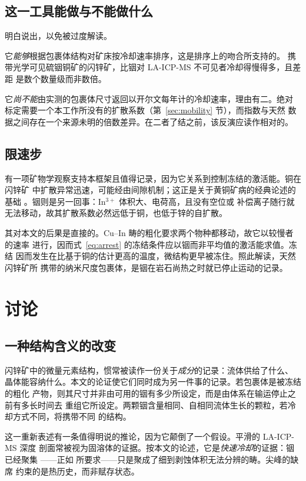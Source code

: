 \documentclass[11pt,a4paper]{ctexart}
\begin{document}
\subsection{这一工具能做与不能做什么}

明白说出，以免被过度解读。

它\emph{能够}根据包裹体结构对矿床按冷却速率排序，这是排序上的吻合所支持的。
携带光学可见硫铟铜矿的闪锌矿，比铟对 LA-ICP-MS 不可见者冷却得慢得多，且差距
是数个数量级而非数倍。

它\emph{尚不能}由实测的包裹体尺寸返回以开尔文每年计的冷却速率，理由有二。绝对
标定需要一个本工作所没有的扩散系数（第~\ref{sec:mobility} 节），而指数与天然
数据之间存在一个来源未明的倍数差异。在二者了结之前，该反演应读作相对的。

\subsection{限速步}

有一项矿物学观察支持本框架且值得记录，因为它关系到控制冻结的激活能。铜在闪锌矿
中扩散异常迅速，可能经由间隙机制；这正是关于黄铜矿病的经典论述的基础
\citep{barton1987}。铟则是另一回事：In$^{3+}$ 体积大、电荷高，且没有空位或
补偿离子随行就无法移动，故其扩散系数必然远低于铜，也低于锌的自扩散。

其对本文的后果是直接的。Cu--In 畴的粗化要求两个物种都移动，故它以较慢者的速率
进行，因而式~\eqref{eq:arrest} 的冻结条件应以铟而非平均值的激活能求值。冻结
因而发生在比基于铜的估计更高的温度，微结构更早被冻住。照此解读，天然闪锌矿所
携带的纳米尺度包裹体，是铟在岩石尚热之时就已停止运动的记录。

\section{讨论}
\label{sec:discussion}

\subsection{一种结构含义的改变}

闪锌矿中的微量元素结构，惯常被读作一份关于\emph{成分}的记录：流体供给了什么、
晶体能容纳什么。本文的论证使它们同时成为另一件事的记录。若包裹体是被冻结的粗化
产物，则其尺寸并非由可用的铟有多少所设定，而是由体系在输运停止之前有多长时间去
重组它所设定。两颗铟含量相同、自相同流体生长的颗粒，若冷却方式不同，将携带不同
的结构。

这一重新表述有一条值得明说的推论，因为它颠倒了一个假设。平滑的 LA-ICP-MS 深度
剖面常被视为固溶体的证据。按本文的论述，它是\emph{快速冷却}的证据：铟已经聚集
——正如 \citet{yu2026b} 所要求——只是聚成了细到剥蚀体积无法分辨的畴。尖峰的缺席
约束的是热历史，而非赋存状态。
\end{document}
